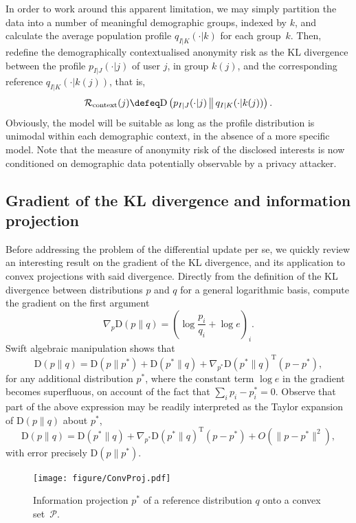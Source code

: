 In order to work around this apparent limitation, we may simply partition the data into a number of meaningful demographic groups, indexed by $k$, and calculate the average population profile $q_{I|K}(\cdot|k)$ for each group~$k$. Then, redefine the demographically contextualised anonymity risk as the KL divergence between the profile $p_{I|J}(\cdot|j)$ of user $j$, in group $k(j)$, and the corresponding reference $q_{I|K}(\cdot|k(j))$, that is,
$$\mathcal{R}_\text{context}(j)\defeq\text{D}\left(p_{I|J}(\cdot|j)\,\middle\|\,q_{I|K}(\cdot|k(j))\right).$$
Obviously, the model will be suitable as long as the profile distribution is unimodal within each demographic context, in the absence of a more specific model. Note that the measure of anonymity risk of the disclosed interests is now conditioned on demographic data potentially observable by a privacy attacker.

\subsection{Gradient of the KL divergence and information projection}
\label{sec:1.3}

\noindent
Before addressing the problem of the differential update per se, we quickly review an interesting result on the gradient of the KL divergence, and its application to convex projections with said divergence. Directly from the definition of the KL divergence between distributions $p$ and $q$ for a general logarithmic basis, compute the gradient on the first argument
$$\nabla_p\text{D}(p\|q)={\left(\log \frac{p_i}{q_i}+\log e\right)}_i.$$
Swift algebraic manipulation shows that
$$\text{D}(p\|q)=\text{D}(p\|p^*)+\text{D}(p^*\|q)+\nabla_{p^*}\text{D}(p^*\|q)^\text{T}(p-p^*),$$
for any additional distribution $p^*$, where the constant term $\log e$ in the gradient becomes superfluous, on account of the fact that $\sum_i p_i-p_i^*=0$. Observe that part of the above expression may be readily interpreted as the Taylor expansion of $\text{D}(p\|q)$ about $p^*$,
$$\text{D}(p\|q)=\text{D}(p^*\|q)+\nabla_{p^*}\text{D}(p^*\|q)^\text{T}(p-p^*)+O(\|p-p^*\|^2),$$
with error precisely $\text{D}(p\|p^*)$.

\begin{figure}[htb]
\centering
\texttt{[image: figure/ConvProj.pdf]}
\caption{Information projection $p^*$ of a reference distribution $q$ onto a convex set~$\mathscr{P}$.}
\label{fig:1}
\end{figure}

